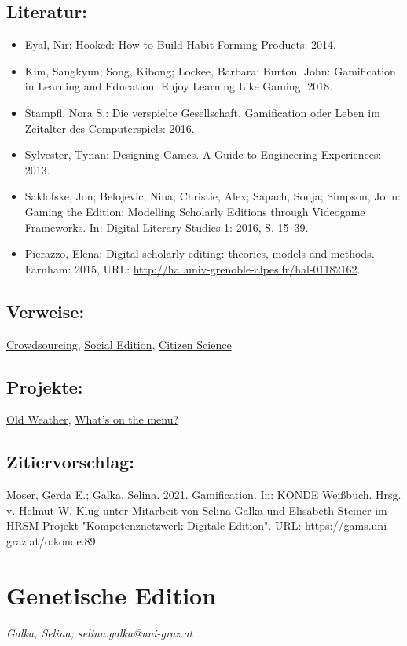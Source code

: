 \documentclass{article}
\begin{document}
        \subsection*{Literatur:}\begin{itemize}\item Eyal, Nir: Hooked: How to Build Habit-Forming Products: 2014.\item Kim, Sangkyun; Song, Kibong; Lockee, Barbara; Burton, John: Gamification in Learning and Education. Enjoy Learning Like Gaming: 2018.\item Stampfl, Nora S.: Die verspielte Gesellschaft. Gamification oder Leben im Zeitalter des Computerspiels: 2016.\item Sylvester, Tynan: Designing Games. A Guide to Engineering Experiences: 2013.\item Saklofske, Jon; Belojevic, Nina; Christie, Alex; Sapach, Sonja; Simpson, John: Gaming the Edition: Modelling Scholarly Editions through Videogame Frameworks. In: Digital Literary Studies 1: 2016, S. 15–39.\item Pierazzo, Elena: Digital scholarly editing: theories, models and methods. Farnham: 2015, URL: \url{http://hal.univ-grenoble-alpes.fr/hal-01182162}.\end{itemize}\subsection*{Verweise:}\href{https://gams.uni-graz.at/o:konde.47}{Crowdsourcing}, \href{https://gams.uni-graz.at/o:konde.169}{Social Edition}, \href{https://gams.uni-graz.at/o:konde.41}{Citizen Science}\subsection*{Projekte:}\href{https://www.oldweather.org}{Old Weather}, \href{http://menus.nypl.org}{What's on the menu?}\subsection*{Zitiervorschlag:}Moser, Gerda E.; Galka, Selina. 2021. Gamification. In: KONDE Weißbuch. Hrsg. v. Helmut W. Klug unter Mitarbeit von Selina Galka und Elisabeth Steiner im HRSM Projekt "Kompetenznetzwerk Digitale Edition". URL: https://gams.uni-graz.at/o:konde.89\newpage\section*{Genetische Edition} \emph{Galka, Selina; selina.galka@uni-graz.at }\\
        
\end{document}
